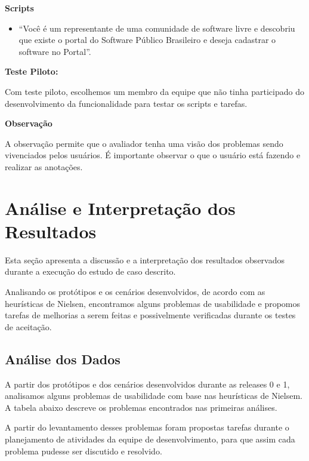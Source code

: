 	\textbf{Scripts}%

	\begin{itemize}
	
		\item ``Você é um representante de uma comunidade de software livre e descobriu que existe o portal do Software Público Brasileiro e deseja cadastrar o software no Portal''.

	\end{itemize}
			
	\textbf{Teste Piloto:}
	
	Com teste piloto, escolhemos um membro da equipe que não tinha participado do desenvolvimento da funcionalidade para testar os scripts e tarefas. %
	
	\textbf{Observação}
	
		A observação permite que o avaliador tenha uma visão dos problemas sendo vivenciados pelos usuários. É importante observar o que o usuário está fazendo e realizar as anotações. %
	

\section{Análise e Interpretação dos Resultados}

Esta seção apresenta a discussão e a interpretação dos resultados observados durante a execução do estudo de caso descrito.

Analisando os protótipos e os cenários desenvolvidos, de acordo com as heurísticas de Nielsen, encontramos alguns problemas de usabilidade e propomos tarefas de melhorias a serem feitas e possivelmente verificadas durante os testes de aceitação.

\subsection{Análise dos Dados}

A partir dos protótipos e dos cenários desenvolvidos durante as releases 0 e 1, analisamos alguns problemas de usabilidade com base nas heurísticas de Nielsem. A tabela abaixo descreve os problemas encontrados nas primeiras análises.

A partir do levantamento desses problemas foram propostas tarefas durante o planejamento de atividades da equipe de desenvolvimento, para que assim cada problema pudesse ser discutido e resolvido.

